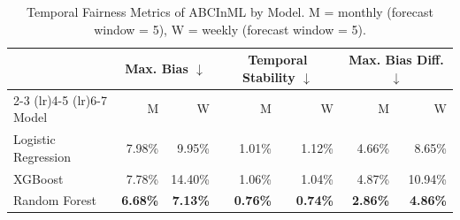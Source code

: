 \begin{table}
  \small
  \caption{Temporal Fairness Metrics of ABCInML by Model. M = monthly (forecast window = 5), W = weekly (forecast window = 5).}
  \label{tab:temporal-abcinml-models-combined}
  \begin{tabular}{lrrrrrr}
    \toprule
     & \multicolumn{2}{c}{Max. Bias $\downarrow$} & \multicolumn{2}{c}{Temporal Stability $\downarrow$} & \multicolumn{2}{c}{Max. Bias Diff. $\downarrow$} \\
    \cmidrule(lr){2-3} \cmidrule(lr){4-5} \cmidrule(lr){6-7}
    Model & M & W & M & W & M & W \\
    \midrule
    Logistic Regression & 7.98\% & 9.95\% & 1.01\% & 1.12\% & 4.66\% & 8.65\% \\
    XGBoost & 7.78\% & 14.40\% & 1.06\% & 1.04\% & 4.87\% & 10.94\% \\
    Random Forest & \textbf{6.68\%} & \textbf{7.13\%} & \textbf{0.76\%} & \textbf{0.74\%} & \textbf{2.86\%} & \textbf{4.86\%} \\
    \bottomrule
  \end{tabular}
\end{table}
